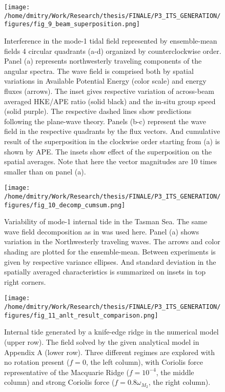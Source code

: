 \documentclass[12pt]{article}
\begin{document}
\begin{figure}
	\centering
	\texttt{[image: /home/dmitry/Work/Research/thesis/FINALE/P3\_ITS\_GENERATION/figures/fig\_9\_beam\_superposition.png]}
	\caption{Interference in the mode-1 tidal field represented by ensemble-mean fields 4 circular 	
	quadrants (a-d) organized by counterclockwise order. Panel (a) represents northwesterly 
	traveling components of the angular spectra. The wave field is comprised both by spatial 
	variations in Available Potential Energy (color scale) and energy fluxes (arrows). The inset 
	gives respective variation of across-beam averaged HKE/APE ratio (solid black) and the in-situ 
	group speed (solid purple). The respective dashed lines show predictions following the  
	plane-wave theory. Panels (b-c) represent the wave field in the respective quadrants by the 
	flux vectors. And cumulative result of the superposition in the clockwise order starting from 
	(a) is shown by APE. The insets show effect of the superposition on the spatial averages. Note 
	that here the vector magnitudes are 10 times smaller than on panel (a).}
	\label{C3.fig:beam_dcmp}
\end{figure}

\begin{figure}
	\centering
	\texttt{[image: /home/dmitry/Work/Research/thesis/FINALE/P3\_ITS\_GENERATION/figures/fig\_10\_decomp\_cumsum.png]}
	\caption{Variability of mode-1 internal tide in the Tasman Sea. The same wave field 
	decomposition as in  was used here. Panel (a) shows variation in the 
	Northwesterly traveling waves. The arrows and color shading are plotted for the ensemble-mean. 
	Between experiments is given by respective variance ellipses. And standard deviation in the 
	spatially averaged characteristics is summarized on insets in top right corners.}
	\label{C3.fig:beam_dcmp_cm}
\end{figure}

\begin{figure}
	\centering
	\texttt{[image: /home/dmitry/Work/Research/thesis/FINALE/P3\_ITS\_GENERATION/figures/fig\_11\_anlt\_result\_comparison.png]}
	\caption{Internal tide generated by a knife-edge ridge in the numerical model (upper row). The 
	field solved by the given analytical model in Appendix A (lower row). Three different regimes 
	are explored with no rotation present ($f = 0$, the left column), with Coriolis force 
	representative of the Macquarie Ridge ($f = 10^{-4}$, the middle column) and strong Coriolis 
	force ($f = 0.8 \omega_{M_2}$, the right column).}
	\label{C3.fig:anlt_sol}
\end{figure}
\end{document}
